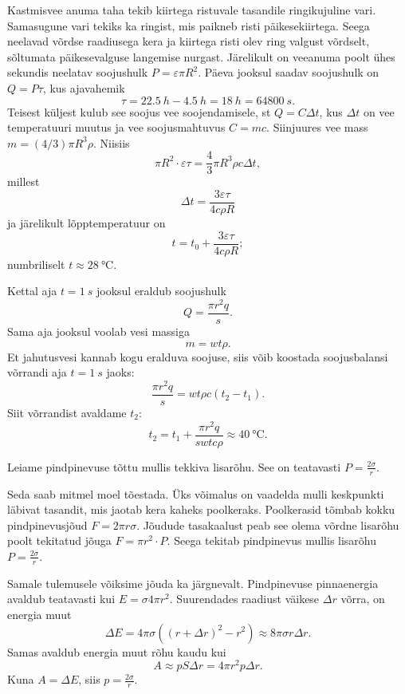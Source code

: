 \documentclass[10pt, twoside]{article}
\begin{document}
{
\solu
Kastmisvee anuma taha tekib kiirtega ristuvale tasandile ringikujuline vari. Samasugune vari tekiks ka ringist, mis paikneb risti päikesekiirtega. Seega neelavad võrdse raadiusega kera ja kiirtega risti olev ring valgust võrdselt, sõltumata päikesevalguse langemise nurgast. Järelikult on veeanuma poolt ühes sekundis neelatav soojushulk $P = \varepsilon \pi R^2$. Päeva jooksul saadav soojushulk on $Q = P \tau$, kus ajavahemik
\[
\tau = \SI{22,5}{h} - \SI{4,5}{h} = \SI{18}{h} = \SI{64800}{s}.
\]
Teisest küljest kulub see soojus vee soojendamisele, st $Q = C\Delta t$, kus $\Delta t$ on vee temperatuuri muutus ja vee soojusmahtuvus $C = mc$. Siinjuures vee mass $m = (4/3) \pi R^3\rho$. Niisiis 
\[
\pi R^2 \cdot \varepsilon \tau = \frac 43 \pi R^3\rho c\Delta t,
\]
millest
\[
\Delta t = \frac{3\varepsilon \tau}{4c\rho R}
\]
ja järelikult lõpptemperatuur on
\[
t = t_0 + \frac{3\varepsilon \tau}{4c\rho R};
\]
numbriliselt $t \approx \SI{28}{\degreeCelsius}$.
\probend
\bigskip


\solu
Kettal aja $t = \SI{1}{s}$ jooksul eraldub soojushulk
\[
Q = \frac{\pi r^2 q}{s}.
\]
Sama aja jooksul voolab vesi massiga
\[
m = wt\rho.
\]
Et jahutusvesi kannab kogu eralduva soojuse, siis võib koostada soojusbalansi võrrandi aja $t = \SI{1}{s}$ jaoks:
\[
\frac{\pi r^{2} q}{s}=w t \rho c\left(t_{2}-t_{1}\right).
\]
Siit võrrandist avaldame $t_2$:
\[
t_2 = t_1 + \frac{\pi r^2q}{swtc\rho} \approx \SI{40}{\degreeCelsius}.
\]
\probend
\bigskip


\solu
Leiame pindpinevuse tõttu mullis tekkiva lisarõhu. See on teatavasti $P = \frac{2\sigma}{r}$.

Seda saab mitmel moel tõestada. Üks võimalus on vaadelda mulli keskpunkti läbivat tasandit, mis jaotab kera kaheks poolkeraks. Poolkerasid tõmbab kokku pindpinevusjõud $F = 2\pi r\sigma$. Jõudude tasakaalust peab see olema võrdne lisarõhu poolt tekitatud jõuga $F = \pi r^2 \cdot P$. Seega tekitab pindpinevus mullis lisarõhu $P = \frac{2\sigma}{r}$.

Samale tulemusele võiksime jõuda ka järgnevalt. Pindpinevuse pinnaenergia avaldub teatavasti kui $E = \sigma 4\pi r^2$. Suurendades raadiust väikese $\Delta r$ võrra, on energia muut 
\[
\Delta E = 4\pi \sigma ((r+\Delta r)^2-r^2) \approx 8\pi \sigma r\Delta r.
\]
Samas avaldub energia muut rõhu kaudu kui
\[
A \approx pS\Delta r = 4\pi r^2p\Delta r.
\]
Kuna $A = \Delta E$, siis $p = \frac{2\sigma}{r}$.

}
\end{document}
